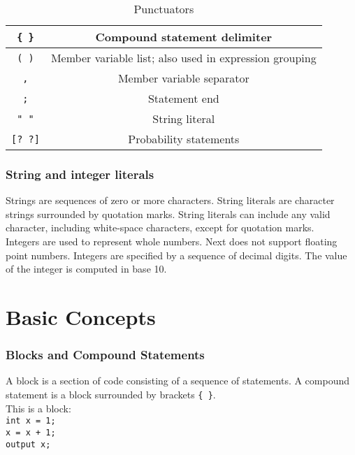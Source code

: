 \documentclass[12pt]{article}
\begin{document}
\begin{table}[htdp]
\caption{Punctuators}
\begin{center}
\begin{tabular}{|c|c|}
\hline
\texttt{\{ \}} & Compound statement delimiter \\
\hline
\texttt{( )} & Member variable list; also used in expression grouping \\
\hline
\texttt{,} & Member variable separator \\
\hline
\texttt{;} & Statement end \\
\hline 
\texttt{" "} & String literal \\
\hline
\texttt{[? ?]} & Probability statements \\ 
\hline
\end{tabular}
\end{center}
\label{punctuators}
\end{table}%

\subsubsection{String and integer literals}
Strings are sequences of zero or more characters.  String literals are character strings surrounded by quotation marks.  String literals can include any valid character, including white-space characters, except for quotation marks. \\

\noindent Integers are used to represent whole numbers.  Next does not support floating point numbers.  Integers are specified by a sequence of decimal digits.  The value of the integer is computed in base 10.

\section{Basic Concepts}

\subsubsection{Blocks and Compound Statements}
A block is a section of code consisting of a sequence of statements.  A compound statement is a block surrounded by brackets \texttt{\{ \}}. \\

\noindent This is a block: \\

\texttt{int x = 1;} \\
\indent \texttt{x = x + 1;} \\
\indent \texttt{output x;} \\
\end{document}
